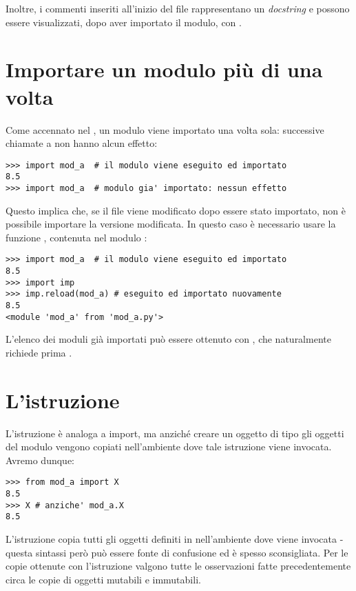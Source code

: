 Inoltre, i commenti inseriti all'inizio del file rappresentano un
\emph{docstring} e possono essere visualizzati, dopo
aver importato il modulo, con .

\section{Importare un modulo pi\`u di una volta}

Come accennato nel , un modulo viene importato
una volta sola: successive chiamate a  non hanno alcun effetto:
\begin{verbatim}
>>> import mod_a  # il modulo viene eseguito ed importato
8.5
>>> import mod_a  # modulo gia' importato: nessun effetto
\end{verbatim}
Questo implica che, se il file  viene modificato dopo
essere stato importato, non \`e possibile importare la versione
modificata. In questo caso \`e necessario usare la funzione
, contenuta nel modulo :
\begin{verbatim}
>>> import mod_a  # il modulo viene eseguito ed importato
8.5
>>> import imp
>>> imp.reload(mod_a) # eseguito ed importato nuovamente
8.5
<module 'mod_a' from 'mod_a.py'>
\end{verbatim}
L'elenco dei moduli gi\`a importati pu\`o essere ottenuto con
, che naturalmente richiede prima
.

\section{L'istruzione }

L'istruzione  \`e analoga a import, ma anzich\'e creare un
oggetto di tipo  gli oggetti del modulo vengono copiati
nell'ambiente dove tale istruzione viene invocata. Avremo dunque:
\begin{verbatim}
>>> from mod_a import X
8.5
>>> X # anziche' mod_a.X
8.5
\end{verbatim}
L'istruzione  copia tutti gli oggetti
definiti in  nell'ambiente dove viene invocata -
questa sintassi per\`o pu\`o essere fonte di confusione ed \`e spesso
sconsigliata. Per le copie ottenute con l'istruzione 
valgono tutte le osservazioni fatte precedentemente circa le copie di
oggetti mutabili e immutabili.

